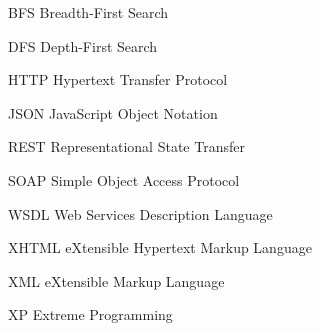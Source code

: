 \begin{siglas}
  \item[BFS] Breadth-First Search
  \item[DFS] Depth-First Search
  \item[HTTP] Hypertext Transfer Protocol
  \item[JSON] JavaScript Object Notation
  \item[REST] Representational State Transfer
  \item[SOAP] Simple Object Access Protocol
  \item[WSDL] Web Services Description Language
  \item[XHTML] eXtensible Hypertext Markup Language
  \item[XML] eXtensible Markup Language
  \item[XP] Extreme Programming
\end{siglas}
